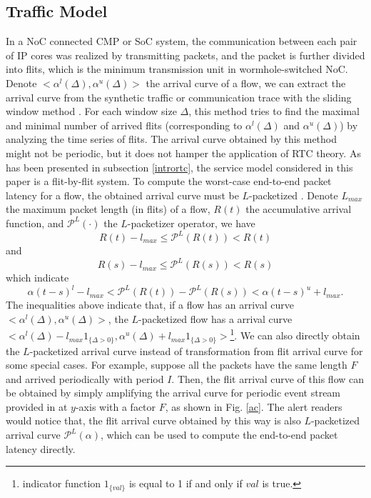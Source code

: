 \documentclass[10pt,journal]{IEEEtran}
\begin{document}
\subsection{Traffic Model}\label{traffic}
In a NoC connected CMP or SoC system, the communication between each pair of IP cores was realized by transmitting packets, and the packet is further divided into flits, which is the minimum transmission unit in wormhole-switched NoC. Denote $<\alpha^l(\Delta),\alpha^u(\Delta)>$ the arrival curve of a flow, we can extract the arrival curve from the synthetic traffic or communication trace with the sliding window method \cite{1253607}. For each window size $\Delta$, this method tries to find the maximal and minimal number of arrived flits (corresponding to $\alpha^l(\Delta)$ and $\alpha^u(\Delta)$) by analyzing the time series of flits. The arrival curve obtained by this method might not be periodic, but it does not hamper the application of RTC theory. As has been presented in subsection \ref{intrortc}, the service model considered in this paper is a flit-by-flit system. To compute the worst-case end-to-end packet latency for a flow, the obtained arrival curve must be $L$-packetized \cite{Boudec2001Network}. Denote $L_{max}$ the maximum packet length (in flits) of a flow, $R(t)$ the accumulative arrival function, and $\mathcal{P}^L(\cdot)$ the $L$-packetizer operator, we have \cite{Boudec2001Network}
$$R(t)-l_{max}\leq \mathcal{P}^L(R(t))<R(t)$$
and
$$R(s)-l_{max}\leq \mathcal{P}^L(R(s))<R(s)$$
which indicate
$$\alpha(t-s)^l-l_{max}<\mathcal{P}^L(R(t))-\mathcal{P}^L(R(s))<\alpha(t-s)^u+l_{max}.$$
The inequalities above indicate that, if a flow has an arrival curve $<\alpha^l(\Delta),\alpha^u(\Delta)>$, the $L$-packetized flow has a arrival curve $<\alpha^l(\Delta)-l_{max}1_{\{\Delta>0\}},\alpha^u(\Delta)+l_{max}1_{\{\Delta>0\}}>$\footnote{indicator function $1_{\{val\}}$ is equal to 1 if and only if $val$ is true.}. We can also directly obtain the $L$-packetized arrival curve instead of transformation from flit arrival curve for some special cases. For example, suppose all the packets have the same length $F$ and arrived periodically with period $I$. Then, the flit arrival curve of this flow can be obtained by simply amplifying the arrival curve for periodic event stream provided in \cite{1253607} at $y$-axis with a factor $F$, as shown in Fig. \ref{ac}. The alert readers would notice that, the flit arrival curve obtained by this way is also $L$-packetized arrival curve $\mathcal{P}^L(\alpha)$, which can be used to compute the end-to-end packet latency directly.
\end{document}
